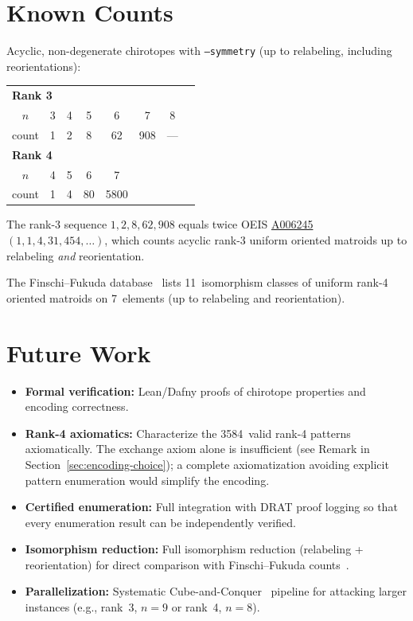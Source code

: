 \documentclass[11pt]{article}
\theoremstyle{definition}
\begin{document}
\section{Known Counts}

Acyclic, non-degenerate chirotopes with \texttt{--symmetry} (up to relabeling, including reorientations):

\begin{center}
\begin{tabular}{c|ccccccc}
\multicolumn{8}{l}{\textbf{Rank 3}} \\
$n$ & 3 & 4 & 5 & 6 & 7 & 8 \\
\hline
count & 1 & 2 & 8 & 62 & 908 & --- \\[0.5em]
\multicolumn{8}{l}{\textbf{Rank 4}} \\
$n$ & 4 & 5 & 6 & 7 \\
\hline
count & 1 & 4 & 80 & 5800
\end{tabular}
\end{center}

The rank-3 sequence $1, 2, 8, 62, 908$ equals twice OEIS \href{https://oeis.org/A006245}{A006245} $(1, 1, 4, 31, 454, \ldots)$, which counts acyclic rank-3 uniform oriented matroids up to relabeling \emph{and} reorientation.

The Finschi--Fukuda database~\cite{FinschiF2001} lists 11~isomorphism classes of uniform rank-4 oriented matroids on 7~elements (up to relabeling and reorientation).

\section{Future Work}

\begin{itemize}
\item \textbf{Formal verification:} Lean/Dafny proofs of chirotope properties and encoding correctness.
\item \textbf{Rank-4 axiomatics:} Characterize the 3584~valid rank-4 patterns axiomatically. The exchange axiom alone is insufficient (see Remark in Section~\ref{sec:encoding-choice}); a complete axiomatization avoiding explicit pattern enumeration would simplify the encoding.
\item \textbf{Certified enumeration:} Full integration with DRAT proof logging so that every enumeration result can be independently verified.
\item \textbf{Isomorphism reduction:} Full isomorphism reduction (relabeling + reorientation) for direct comparison with Finschi--Fukuda counts~\cite{FinschiF2001}.
\item \textbf{Parallelization:} Systematic Cube-and-Conquer~\cite{HeuleKM2012} pipeline for attacking larger instances (e.g., rank~3, $n=9$ or rank~4, $n=8$).
\end{itemize}



\end{document}

